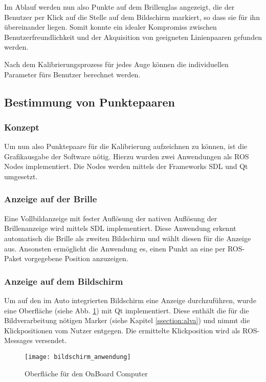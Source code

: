 Im Ablauf werden nun also Punkte auf dem Brillenglas angezeigt, die der Benutzer per Klick auf die Stelle auf dem Bildschirm markiert, so dass sie für ihn übereinander liegen. Somit konnte ein idealer Kompromiss zwischen Benutzerfreundlichkeit und der Akquisition von geeigneten Linienpaaren gefunden werden.

Nach dem Kalibrierungsprozess für jedes Auge können die individuellen Parameter fürs Benutzer berechnet werden.


\subsection{Bestimmung von Punktepaaren}
\label{chap:punktepaare}
\subsubsection{Konzept}
Um nun also Punktepaare für die Kalibrierung aufzeichnen zu können, ist die Grafikausgabe der Software nötig. Hierzu wurden zwei Anwendungen als ROS Nodes implementiert. Die Nodes werden mittels der Frameworks \ac{SDL}  \cite{sdl} und  Qt \cite{qt} umgesetzt.
\subsubsection{Anzeige auf der Brille}
Eine Vollbildanzeige mit fester Auflösung der nativen Auflösung der Brillenanzeige wird mittels SDL implementiert. Diese Anwendung erkennt automatisch die Brille als zweiten Bildschirm und wählt diesen für die Anzeige aus. Ansonsten ermöglicht die Anwendung es, einen Punkt an eine per ROS-Paket vorgegebene Position anzuzeigen.

\subsubsection{Anzeige auf dem Bildschirm}
Um auf den im Auto integrierten Bildschirm eine Anzeige durchzuführen, wurde eine Oberfläche (siehe Abb. \ref{fig:fensteranwendung}) mit Qt implementiert. Diese enthält die für die Bildverarbeitung nötigen Marker (siehe Kapitel \ref{ssection:alva}) und nimmt die Klickpositionen vom Nutzer entgegen. Die ermittelte Klickposition wird als ROS-Messages versendet.
\begin{figure}[h]
   \centering
   \texttt{[image: bildschirm\_anwendung]}
   \caption{Oberfläche für den OnBoard Computer}
   \label{fig:fensteranwendung}
\end{figure}


